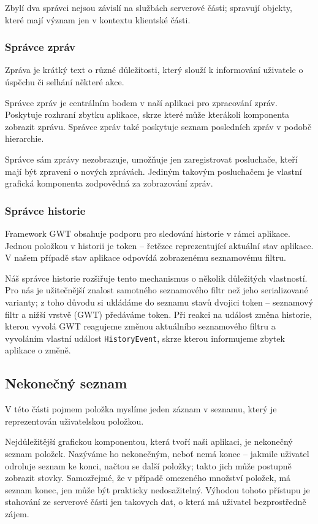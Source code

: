 \bigskip

Zbylí dva správci nejsou závislí na službách serverové části; spravují objekty, které mají význam jen v kontextu klientské části.

\subsubsection{Správce zpráv}

Zpráva je krátký text o různé důležitosti, který slouží k informování uživatele o úspěchu či selhání některé akce.

Správce zpráv je centrálním bodem v naší aplikaci pro zpracování zpráv.
Poskytuje rozhraní zbytku aplikace, skrze které může kterákoli komponenta zobrazit zprávu.
Správce zpráv také poskytuje seznam posledních zpráv v podobě hierarchie.

Správce sám zprávy nezobrazuje, umožňuje jen zaregistrovat posluchače, kteří mají být zpraveni o nových zprávách.
Jediným takovým posluchačem je vlastní grafická komponenta zodpovědná za zobrazování zpráv.


\subsubsection{Správce historie}

Framework GWT obsahuje podporu pro sledování historie v rámci aplikace.
Jednou položkou v historii je token -- řetězec reprezentující aktuální stav aplikace.
V našem případě stav aplikace odpovídá zobrazenému seznamovému filtru.

Náš správce historie rozšiřuje tento mechanismus o několik důležitých vlastností.
Pro nás je užitečnější znalost samotného seznamového filtr než jeho serializované varianty; z toho důvodu si ukládáme do seznamu stavů dvojici token -- seznamový filtr a nižší vrstvě (GWT) předáváme token.
Při reakci na událost změna historie, kterou vyvolá GWT reagujeme změnou aktuálního seznamového filtru a vyvoláním vlastní událost \verb|HistoryEvent|, skrze kterou informujeme zbytek aplikace o změně.

\subsection{Nekonečný seznam}

V této části pojmem položka myslíme jeden záznam v seznamu, který je reprezentován uživatelskou položkou.

Nejdůležitější grafickou komponentou, která tvoří naši aplikaci, je nekonečný seznam položek.
Nazýváme ho nekonečným, neboť nemá konec – jakmile uživatel odroluje seznam ke konci, načtou se další položky; takto jich může postupně zobrazit stovky.
Samozřejmé, že v případě omezeného množství položek, má seznam konec, jen může být prakticky nedosažitelný.
Výhodou tohoto přístupu je stahování ze serverové části jen takovych dat, o která má uživatel bezprostředně zájem.

